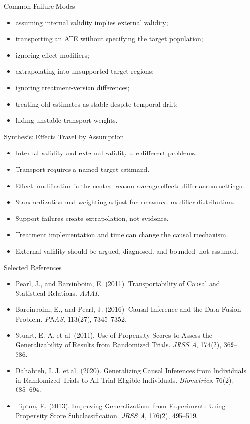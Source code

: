 \documentclass[aspectratio=169,11pt]{beamer}
\begin{document}
\begin{frame}{Common Failure Modes}
\begin{itemize}
\item assuming internal validity implies external validity;
\item transporting an ATE without specifying the target population;
\item ignoring effect modifiers;
\item extrapolating into unsupported target regions;
\item ignoring treatment-version differences;
\item treating old estimates as stable despite temporal drift;
\item hiding unstable transport weights.
\end{itemize}
\end{frame}

\begin{frame}{Synthesis: Effects Travel by Assumption}
\begin{itemize}
\item Internal validity and external validity are different problems.
\item Transport requires a named target estimand.
\item Effect modification is the central reason average effects differ across settings.
\item Standardization and weighting adjust for measured modifier distributions.
\item Support failures create extrapolation, not evidence.
\item Treatment implementation and time can change the causal mechanism.
\item External validity should be argued, diagnosed, and bounded, not assumed.
\end{itemize}
\end{frame}

\begin{frame}{Selected References}
\small
\begin{itemize}
\item Pearl, J., and Bareinboim, E. (2011). Transportability of Causal and Statistical Relations. \textit{AAAI}.
\item Bareinboim, E., and Pearl, J. (2016). Causal Inference and the Data-Fusion Problem. \textit{PNAS}, 113(27), 7345--7352.
\item Stuart, E. A. et al. (2011). Use of Propensity Scores to Assess the Generalizability of Results from Randomized Trials. \textit{JRSS A}, 174(2), 369--386.
\item Dahabreh, I. J. et al. (2020). Generalizing Causal Inferences from Individuals in Randomized Trials to All Trial-Eligible Individuals. \textit{Biometrics}, 76(2), 685--694.
\item Tipton, E. (2013). Improving Generalizations from Experiments Using Propensity Score Subclassification. \textit{JRSS A}, 176(2), 495--519.
\end{itemize}
\end{frame}

\contactslide
\end{document}
